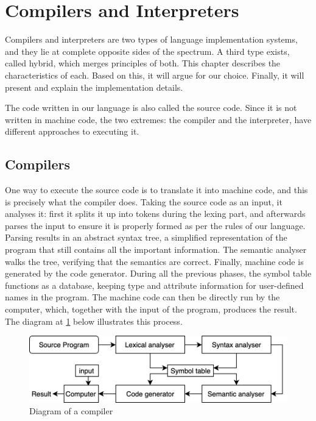 \section{Compilers and Interpreters}
\label{background:evaluator}

\par
Compilers and interpreters are two types of language implementation systems, and they lie at complete opposite sides of the spectrum. A third type exists, called hybrid, which merges principles of both. This chapter describes the characteristics of each. Based on this, it will argue for our choice. Finally, it will present and explain the implementation details.

The code written in our language is also called the source code. Since it is not written in machine code, the two extremes: the compiler and the interpreter, have different approaches to executing it.

\subsection{Compilers}\label{Evaluator:Compilers}
One way to execute the source code is to translate it into machine code, and this is precisely what the compiler does. Taking the source code as an input, it analyses it: first it splits it up into tokens during the lexing part, and afterwards parses the input to ensure it is properly formed as per the rules of our language. Parsing results in an abstract syntax tree, a simplified representation of the program that still contains all the important information. The semantic analyser walks the tree, verifying that the semantics are correct. Finally, machine code is generated by the code generator. During all the previous phases, the symbol table functions as a database, keeping type and attribute information for user-defined names in the program. The machine code can then be directly run by the computer, which, together with the input of the program, produces the result. The diagram at \cref{fig:compilerdiag} below illustrates this process.

\begin{figure}[!ht]
  \centering
  \includegraphics[scale=0.3]{Pictures/compiler-diagram.png}
  \caption{Diagram of a compiler}
  \label{fig:compilerdiag}
\end{figure}

